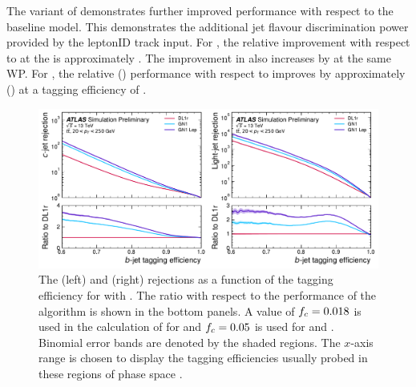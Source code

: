The \GNNLep variant of \GNN demonstrates further improved performance with respect to the baseline model.
This demonstrates the additional jet flavour discrimination power provided by the leptonID track input.
For \ttbarjets, the relative \crej improvement with respect to \GNN at the \bWP{\ttlo} is approximately .
The improvement in \lrej also increases by  at the same WP.
For \Zprimejets, the relative \crej (\lrej) performance with respect to \GNN improves by approximately  () at a \bjet tagging efficiency of \pct{\zplo}.

\begin{figure}[!p]
    \centering
    \includegraphics[width=\textwidth]{chapters/gnn_tagger/figs/results/main/ttbar/ttbar_roc_btag.pdf}
    \caption{The \cjet (left) and \ljet (right) rejections as a function of the \bjet tagging efficiency for \ttbarjets with \ttbarpt .
             The ratio with respect to the performance of the \DLr algorithm is shown in the bottom panels.
             A value of $f_c = 0.018$ is used in the calculation of \Db for \DLr and $f_c = 0.05$ is used for \GNN and \GNNLep.
             Binomial error bands are denoted by the shaded regions.
             The $x$-axis range is chosen to display the \bjet tagging efficiencies usually probed in these regions of phase space \cite{ATL-PHYS-PUB-2022-027}.}
    \label{fig:ttbar_btag_roc}
\end{figure}


